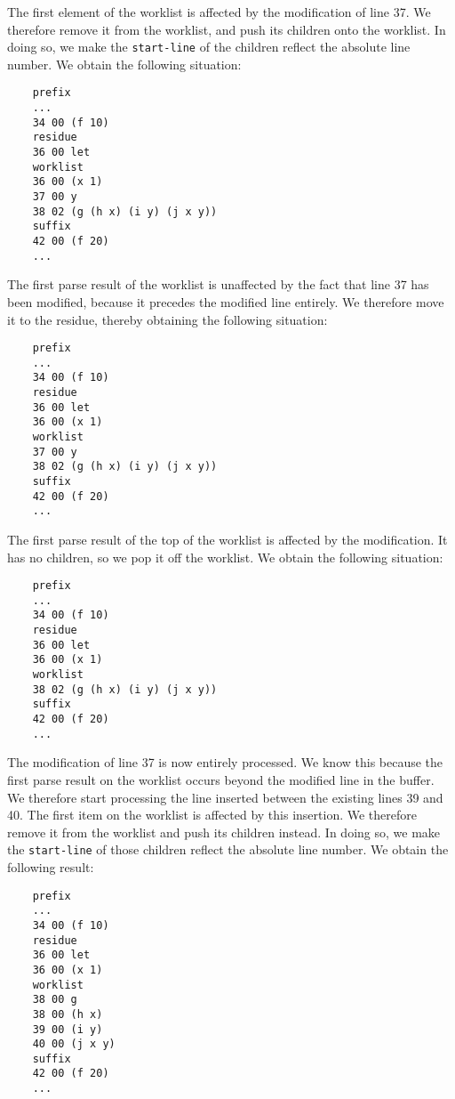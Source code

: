 The first element of the worklist is affected by the modification of
line 37.  We therefore remove it from the worklist, and push its
children onto the worklist.  In doing so, we make the
\texttt{start-line} of the children reflect the absolute line number.
We obtain the following situation:

{\small\begin{verbatim}
    prefix
    ...
    34 00 (f 10)
    residue
    36 00 let
    worklist
    36 00 (x 1)
    37 00 y
    38 02 (g (h x) (i y) (j x y))
    suffix
    42 00 (f 20)
    ...
\end{verbatim}}

The first parse result of the worklist is unaffected by the fact that
line 37 has been modified, because it precedes the modified line
entirely.  We therefore move it to the residue, thereby obtaining the
following situation:

{\small\begin{verbatim}
    prefix
    ...
    34 00 (f 10)
    residue
    36 00 let
    36 00 (x 1)
    worklist
    37 00 y
    38 02 (g (h x) (i y) (j x y))
    suffix
    42 00 (f 20)
    ...
\end{verbatim}}

The first parse result of the top of the worklist is affected by the
modification.  It has no children, so we pop it off the worklist.  We
obtain the following situation:

{\small\begin{verbatim}
    prefix
    ...
    34 00 (f 10)
    residue
    36 00 let
    36 00 (x 1)
    worklist
    38 02 (g (h x) (i y) (j x y))
    suffix
    42 00 (f 20)
    ...
\end{verbatim}}

The modification of line 37 is now entirely processed.  We know this
because the first parse result on the worklist occurs beyond the
modified line in the buffer.  We therefore start processing the line
inserted between the existing lines 39 and 40.  The first item on the
worklist is affected by this insertion.  We therefore remove it from
the worklist and push its children instead.  In doing so, we make the
\texttt{start-line} of those children reflect the absolute line
number.  We obtain the following result:

{\small\begin{verbatim}
    prefix
    ...
    34 00 (f 10)
    residue
    36 00 let
    36 00 (x 1)
    worklist
    38 00 g
    38 00 (h x)
    39 00 (i y)
    40 00 (j x y)
    suffix
    42 00 (f 20)
    ...
\end{verbatim}}

